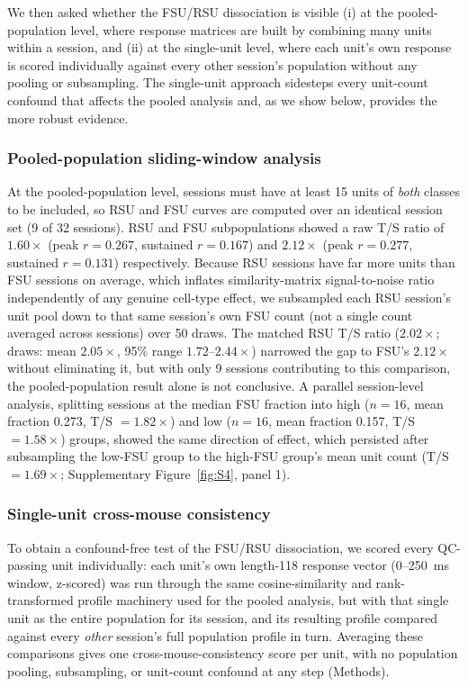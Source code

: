 \documentclass[11pt,onecolumn]{article}
\begin{document}
We then asked whether the FSU/RSU dissociation is visible (i) at the
pooled-population level, where response matrices are built by combining
many units within a session, and (ii) at the single-unit level, where each
unit's own response is scored individually against every other session's
population without any pooling or subsampling.  The single-unit approach
sidesteps every unit-count confound that affects the pooled analysis and,
as we show below, provides the more robust evidence.

\subsubsection{Pooled-population sliding-window analysis}

At the pooled-population level, sessions must have at least 15 units of
\textit{both} classes to be included, so RSU and FSU curves are computed
over an identical session set (9 of 32 sessions).  RSU and FSU
subpopulations showed a raw T/S ratio of $1.60\times$ (peak $r = 0.267$,
sustained $r = 0.167$) and $2.12\times$ (peak $r = 0.277$, sustained
$r = 0.131$) respectively.  Because RSU sessions have far more units than
FSU sessions on average, which inflates similarity-matrix signal-to-noise
ratio independently of any genuine cell-type effect, we subsampled each
RSU session's unit pool down to that same session's own FSU count (not a
single count averaged across sessions) over 50 draws.  The matched RSU T/S
ratio ($2.02\times$; draws: mean $2.05\times$, 95\% range
$1.72$--$2.44\times$) narrowed the gap to FSU's $2.12\times$ without
eliminating it, but with only 9 sessions contributing to this comparison,
the pooled-population result alone is not conclusive.  A parallel
session-level analysis, splitting sessions at the median FSU fraction into
high ($n = 16$, mean fraction 0.273, T/S $= 1.82\times$) and low ($n = 16$,
mean fraction 0.157, T/S $= 1.58\times$) groups, showed the same direction
of effect, which persisted after subsampling the low-FSU group to the
high-FSU group's mean unit count (T/S $= 1.69\times$; Supplementary
Figure~\ref{fig:S4}, panel 1).

\subsubsection{Single-unit cross-mouse consistency}

To obtain a confound-free test of the FSU/RSU dissociation, we scored
every QC-passing unit individually: each unit's own length-118 response
vector (0--250~ms window, z-scored) was run through the same
cosine-similarity and rank-transformed profile machinery used for the
pooled analysis, but with that single unit as the entire population for
its session, and its resulting profile compared against every
\textit{other} session's full population profile in turn.  Averaging
these comparisons gives one cross-mouse-consistency score per unit,
with no population pooling, subsampling, or unit-count confound at any
step (Methods).
\end{document}
